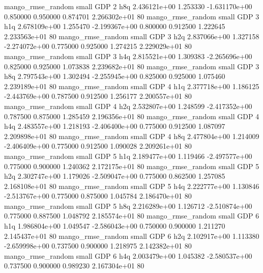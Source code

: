 mango_rmse_random      small      GDP                 2                  h8q 2.436121e+00      1.253330 -1.631170e+00 0.850000 0.950000       0.874701 2.266302e+01 80
mango_rmse_random      small      GDP                 3                  h1q 2.678109e+00      1.255470 -2.199367e+00 0.800000 0.912500       1.222645 2.233563e+01 80
mango_rmse_random      small      GDP                 3                  h2q 2.837066e+00      1.327158 -2.274072e+00 0.775000 0.925000       1.274215 2.229029e+01 80
mango_rmse_random      small      GDP                 3                  h4q 2.815521e+00      1.309383 -2.265696e+00 0.825000 0.925000       1.073838 2.239682e+01 80
mango_rmse_random      small      GDP                 3                  h8q 2.797543e+00      1.302494 -2.255945e+00 0.825000 0.925000       1.075460 2.239189e+01 80
mango_rmse_random      small      GDP                 4                  h1q 2.377718e+00      1.186125 -2.443769e+00 0.787500 0.912500       1.256177 2.200557e+01 80
mango_rmse_random      small      GDP                 4                  h2q 2.532807e+00      1.248599 -2.417352e+00 0.787500 0.875000       1.285459 2.196356e+01 80
mango_rmse_random      small      GDP                 4                  h4q 2.483557e+00      1.218193 -2.406400e+00 0.775000 0.912500       1.087097 2.209898e+01 80
mango_rmse_random      small      GDP                 4                  h8q 2.477804e+00      1.214009 -2.406409e+00 0.775000 0.912500       1.090028 2.209261e+01 80
mango_rmse_random      small      GDP                 5                  h1q 2.189477e+00      1.119466 -2.497577e+00 0.775000 0.900000       1.240362 2.172175e+01 80
mango_rmse_random      small      GDP                 5                  h2q 2.302747e+00      1.179026 -2.509047e+00 0.775000 0.862500       1.257085 2.168108e+01 80
mango_rmse_random      small      GDP                 5                  h4q 2.222777e+00      1.130846 -2.513767e+00 0.775000 0.875000       1.045784 2.186470e+01 80
mango_rmse_random      small      GDP                 5                  h8q 2.216289e+00      1.126712 -2.510874e+00 0.775000 0.887500       1.048792 2.185574e+01 80
mango_rmse_random      small      GDP                 6                  h1q 1.986804e+00      1.049547 -2.586043e+00 0.750000 0.900000       1.211270 2.145437e+01 80
mango_rmse_random      small      GDP                 6                  h2q 2.102917e+00      1.113380 -2.659998e+00 0.737500 0.900000       1.218975 2.142382e+01 80
mango_rmse_random      small      GDP                 6                  h4q 2.003479e+00      1.045382 -2.580537e+00 0.737500 0.900000       0.989230 2.167304e+01 80
